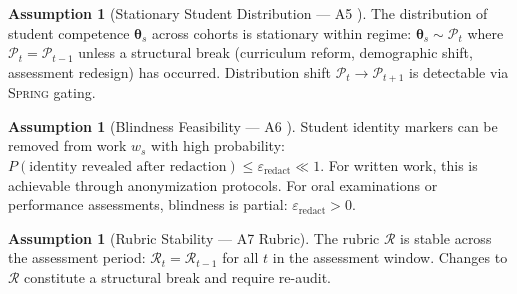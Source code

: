 \documentclass[11pt,a4paper]{article}
\theoremstyle{definition}
\newtheorem{assumption}[theorem]{Assumption}
\theoremstyle{remark}
\newcommand{\Spring}{\textsc{Spring}}
\newcommand{\cP}{\mathcal{P}}
\newcommand{\cR}{\mathcal{R}}
\newcommand{\rubric}{\cR}
\newcommand{\trueScore}{\theta}
\begin{document}
\begin{assumption}[Stationary Student Distribution — A5 ]
\label{asm:A5_edu}
The distribution of student competence $\boldsymbol{\trueScore}_s$ across cohorts is stationary within regime: $\boldsymbol{\trueScore}_s \sim \cP_t$ where $\cP_t = \cP_{t-1}$ unless a structural break (curriculum reform, demographic shift, assessment redesign) has occurred. Distribution shift $\cP_t \to \cP_{t+1}$ is detectable via \Spring{} gating.
\end{assumption}
\begin{assumption}[Blindness Feasibility — A6 ]
\label{asm:A6_edu}
Student identity markers can be removed from work $w_s$ with high probability: $P(\text{identity revealed after redaction}) \le \varepsilon_{\text{redact}} \ll 1$. For written work, this is achievable through anonymization protocols. For oral examinations or performance assessments, blindness is partial: $\varepsilon_{\text{redact}} > 0$.
\end{assumption}
\begin{assumption}[Rubric Stability — A7 Rubric]
\label{asm:A7_edu}
The rubric $\rubric$ is stable across the assessment period: $\rubric_t = \rubric_{t-1}$ for all $t$ in the assessment window. Changes to $\rubric$ constitute a structural break and require re-audit.
\end{assumption}
\end{document}
